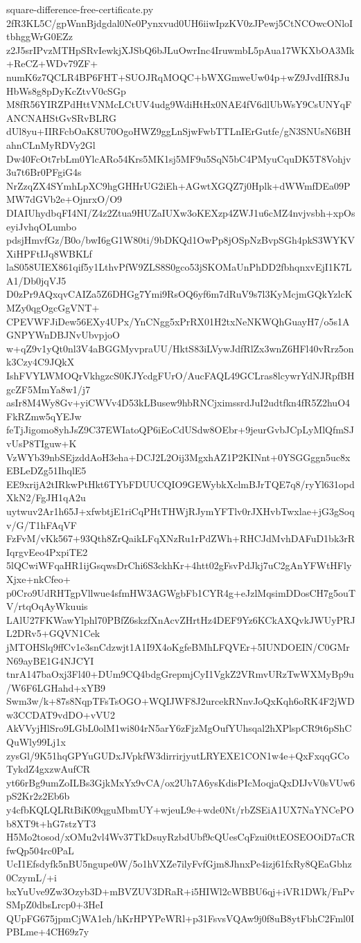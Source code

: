 \documentclass[11pt]{article}
\theoremstyle{definition}
\theoremstyle{remark}
\begin{document}
\begin{filecontents*}[overwrite]{square-difference-free-certificate.py}
2fR3KL5C/gpWnnBjdgdal0Ne0Pynxvud0UH6iiwIpzKV0zJPewj5CtNCOwcONloItbhggWrG0EZz
z2J5srIPvzMTHpSRvIewkjXJSbQ6bJLuOwrInc4IruwmbL5pAua17WKXbOA3Mk+ReCZ+WDv79ZF+
numK6z7QCLR4BP6FHT+SUOJRqMOQC+bWXGmweUw04p+wZ9JvdIfR8JuHbWs8g8pDyKcZtvV0cSGp
M8fR56YIRZPdHttVNMcLCtUV4udg9WdiHtHx0NAE4fV6dlUbWsY9CsUNYqFANCNAHStGvSRvBLRG
dUl8yu+IIRFcbOaK8U70OgoHWZ9ggLnSjwFwbTTLnIErGutfe/gN3SNUsN6BHahnCLnMyRDVy2Gl
Dw40FcOt7rbLm0YlcARo54Krs5MK1sj5MF9u5SqN5bC4PMyuCquDK5T8Vohjv3u7t6Br0PFgiG4s
NrZzqZX4SYmhLpXC9hgGHHrUG2iEh+AGwtXGQZ7j0Hplk+dWWmfDEa09PMW7dGVb2e+OjnrxO/O9
DIAIUhydbqFI4NI/Z4z2Ztua9HUZaIUXw3oKEXzp4ZWJ1u6cMZ4nvjvsbh+xpOseyiJvhqOLumbo
pdsjHmvfGz/B0o/bwI6gG1W80ti/9bDKQd1OwPp8jOSpNzBvpSGh4pkS3WYKVXiHPFtIJq8WBKLf
laS058UIEX861qif5y1LthvPfW9ZLS8S0gco53jSKOMaUnPhDD2fbhqnxvEjI1K7LA1/Db0jqVJ5
D0zPr9AQxqvCAIZa5Z6DHGg7Ymi9RsOQ6yf6m7dRuV9s7l3KyMcjmGQkYzlcKMZy0qgOgcGgVNT+
CPEVWFJiDew56EXy4UPx/YnCNgg5xPrRX01H2txNeNKWQhGuayH7/o5s1AGNPYWnDBJNvUbvpjoO
w+qZ9v1yQt0nl3V4aBGGMyvpraUU/HktS83iLVywJdfRlZx3wnZ6HFl40vRrz5onk3Czy4C9JQkX
IshFVYLWMOQrVkhgzcS0KJYcdgFUrO/AucFAQL49GCLras8lcywrYdNJRpfBHgcZF5MmYa8w1/j7
asIr8M4Wy8Gv+yiCWVv4D53kLBusew9hbRNCjximssrdJuI2udtfkn4fR5Z2huO4FkRZmw5qYEJw
feTjJigomo8yhJsZ9C37EWIatoQP6iEoCdUSdw8OEbr+9jeurGvbJCpLyMlQfmSJvUsP8TIguw+K
VzWYb39nbSEjzddAoH3eha+DCJ2L2Oij3MgxhAZ1P2KINnt+0YSGGggn5uc8xEBLeDZg51IhqlE5
EE9xrijA2tIRkwPtHkt6TYbFDUUCQIO9GEWybkXclmBJrTQE7q8/ryYl631opdXkN2/FgJH1qA2u
uytwuv2Ar1h65J+xfwbtjE1riCqPHtTHWjRJymYFTlv0rJXHvbTwxlae+jG3gSoqv/G/T1hFAqVF
FzFvM/vKk567+93Qth8ZrQaikLFqXNzRu1rPdZWh+RHCJdMvhDAFuD1bk3rRIqrgvEeo4PxpiTE2
5lQCwiWFqaHR1ijGsqwsDrChi6S3ckhKr+4htt02gFsvPdJkj7uC2gAnYFWtHFlyXjxe+nkCfeo+
p0Cro9UdRHTgpVllwue4sfmHW3AGWgbFb1CYR4g+eJzlMqsimDDosCH7g5ouTV/rtqOqAyWkuuis
LAlU27FKWawYlphl70PBfZ6skzfXnAcvZHrtHz4DEF9Yz6KCkAXQvkJWUyPRJL2DRv5+GQVN1Cek
jMTOHSlq9ffCv1e3snCdzwjt1A1I9X4oKgfeBMhLFQVEr+5IUNDOEIN/C0GMrN69ayBE1G4NJCYI
tnrA147baOxj3Fl40+DUm9CQ4bdgGrepmjCyI1VgkZ2VRmvURzTwWXMyBp9u/W6F6LGHahd+xYB9
Swm3w/k+87s8NqpTFsTsOGO+WQIJWF8J2urcekRNnvJoQxKqh6oRK4F2jWDw3CCDAT9vdDO+vVU2
AkVVyjHlSro9LGbL0olM1wi804rN5arY6zFjzMgOufYUhsqal2hXPlspCR9t6pShCQuWly99Lj1x
zysGl/9K51hqGPYuGUDxJVpkfW3dirrirjyutLRYEXE1CON1w4e+QxFxqqGCoTykdZ4gxzwAufCR
yt66rBg9umZoILBs3GjkMxYx9vCA/ox2Uh7A6ysKdisPIcMoqjaQxDIJvV0sVUw6pS2Kr2z2Eb6b
y4cfbKQLQLRtBiK09qguMbmUY+wjeuL9e+wde0Nt/rbZSEiA1UX7NaYNCePOb8XT9t+hG7stzYT3
H5Mo2tosod/xOMu2vl4Wv37TkDsuyRzbdUbf9cQUesCqFzui0ttEOSEOOiD7aCRfwQp504rc0PaL
UcI1Efsdyfk5nBU5ngupe0W/5o1hVXZe7ilyFvfGjm8JhnxPe4izj61fxRy8QEaGbhz0CzymL/+i
bxYuUve9Zw3Ozyb3D+mBVZUV3DRaR+i5HIWl2cWBBU6qj+iVR1DWk/FnPvSMpZ0dbsLrcp0+3HeI
QUpFG675jpmCjWA1eh/hKrHPYPeWRl+p31FsvsVQAw9j0f8uB8ytFbhC2Fml0IPBLme+4CH69z7y

\end{filecontents*}
\end{document}
